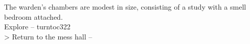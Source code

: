 The warden’s chambers are modest in size, consisting of a study with a smell bedroom attached.\\

 Explore -- turnto{c322}\\
> Return to the mess hall -- 